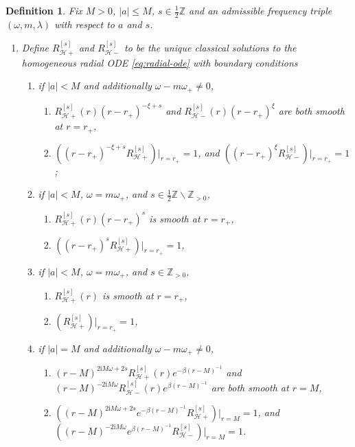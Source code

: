 \documentclass[11pt]{article}
\newtheorem{definition}[proposition]{Definition}
\newcommand{\ii}{\mathrm{i}}
\newcommand{\cH}{\mathcal H}
\numberwithin{equation}{section}
\begin{document}
\begin{definition}\label{def:radial-basis}
Fix $M>0$, $|a|\leq M$, $s\in \frac12\mathbb Z$ and an admissible frequency triple $(\omega,m,\lambda)$ with respect to $a$ and $s$.
\begin{enumerate}[label=\arabic*.]
\item Define $R^{[s]}_{\cH+}$ and $R^{[s]}_{\cH-}$ to be the unique classical solutions to the homogeneous radial ODE \eqref{eq:radial-ode} with boundary conditions
\begin{enumerate}[label=(\alph*)]
\item if $|a|<M$ and additionally $\omega-m\omega_+\neq 0$,
\begin{enumerate}[label=\roman*.]
\item $R^{[s]}_{\cH+}(r)(r-r_+)^{-\xi+s}$ and $R^{[s]}_{\cH-}(r)(r-r_+)^{\xi}$ are both smooth at $r=r_+$,
\item $\left((r-r_+)^{-\xi+s}R^{[s]}_{\cH+}\right)\big|_{r=r_+}=1$, and
 $\left((r-r_+)^{\xi}R^{[s]}_{\cH-}\right)\big|_{r=r_+}=1$;
\end{enumerate}
\item if $|a|<M$, $\omega=m\omega_+$, and $s\in \frac12\mathbb Z\backslash \mathbb Z_{> 0}$,
\begin{enumerate}[label=\roman*.]
\item $R^{[s]}_{\cH+}(r)(r-r_+)^{s}$ is smooth at $r=r_+$,
\item $\left((r-r_+)^{s}R^{[s]}_{\cH+}\right)\big|_{r=r_+}=1$,
\end{enumerate}
\item if $|a|<M$, $\omega=m\omega_+$, and $s\in \mathbb Z_{>0}$,
\begin{enumerate}[label=\roman*.]
\item $R^{[s]}_{\cH+}(r)$ is smooth at $r=r_+$,
\item $\left(R^{[s]}_{\cH+}\right)\big|_{r=r_+}=1$,
\end{enumerate}
\item if $|a|=M$ and additionally $\omega-m\omega_+\neq0$,
\begin{enumerate}[label=\roman*.]
\item $(r-M)^{2\ii M\omega+2s}R^{[s]}_{\cH+}(r)e^{-\beta(r-M)^{-1}}$ and $(r-M)^{-2\ii M\omega}R^{[s]}_{\cH-}(r)e^{\beta(r-M)^{-1}}$ are both smooth at $r=M$,
\item $\left((r-M)^{2\ii M\omega+2s}e^{-\beta(r-M)^{-1}}R^{[s]}_{\cH+}\right)\big|_{r=M}=1$, and
$\left((r-M)^{-2\ii M\omega}e^{\beta(r-M)^{-1}}R^{[s]}_{\cH-}\right)\big|_{r=M}=1$.
\end{enumerate}

\end{enumerate}
\end{enumerate}
\end{definition}
\end{document}
